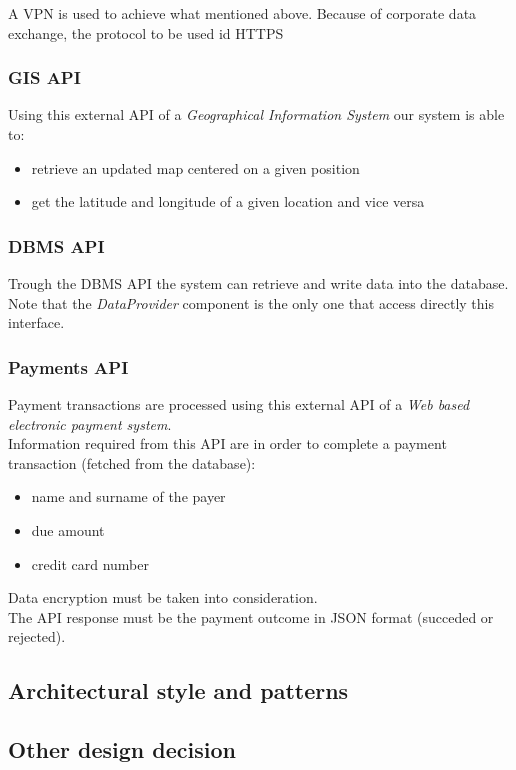 A VPN is used to achieve what mentioned above. Because of corporate data exchange, the protocol to be used id HTTPS

\subsubsection{GIS API}
Using this external API of a \emph{Geographical Information System} our system is able to:
\begin{itemize}
	\item retrieve an updated map centered on a given position
	\item get the latitude and longitude of a given location and vice versa
\end{itemize}

\subsubsection{DBMS API}
Trough the DBMS API the system can retrieve and write data into the database. Note that the \mbox{\emph{DataProvider}} component is the only one that access directly this interface.

\subsubsection{Payments API}
Payment transactions are processed using this external API of a \emph{Web based electronic payment system}.\\
Information required from this API are in order to complete a payment transaction (fetched from the database):
\begin{itemize}
	\item name and surname of the payer
	\item due amount
	\item credit card number
\end{itemize}
Data encryption must be taken into consideration.\\
The API response must be the payment outcome in JSON format (succeded or rejected).
\subsection{Architectural style and patterns}
\subsection{Other design decision}
